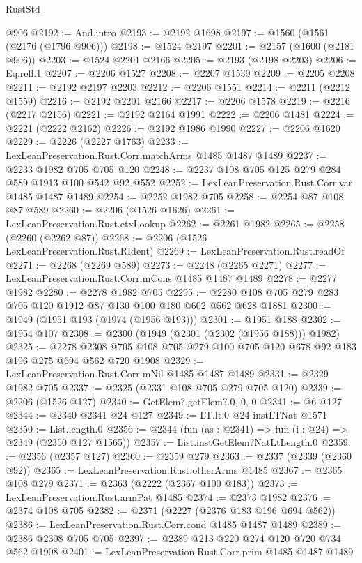 \begin{lexlean}{RustStd}
\begin{coremodule}
    @906
@2192 := And.intro
@2193 := @2192 @1698
@2197 := @1560 (@1561 (@2176 (@1796 @906)))
@2198 := @1524 @2197
@2201 := @2157 (@1600 (@2181 @906))
@2203 := @1524 @2201 @2166
@2205 := @2193 (@2198 @2203)
@2206 := Eq.refl.{1}
@2207 := @2206 @1527
@2208 := @2207 @1539
@2209 := @2205 @2208
@2211 := @2192 @2197 @2203
@2212 := @2206 @1551
@2214 := @2211 (@2212 @1559)
@2216 := @2192 @2201 @2166
@2217 := @2206 @1578
@2219 := @2216 (@2217 @2156)
@2221 := @2192 @2164 @1991
@2222 := @2206 @1481
@2224 := @2221 (@2222 @2162)
@2226 := @2192 @1986 @1990
@2227 := @2206 @1620
@2229 := @2226 (@2227 @1763)
@2233 := LexLeanPreservation.Rust.Corr.matchArms @1485 @1487 @1489
@2237 := @2233 @1982 @705 @705 @120
@2248 := @2237 @108 @705 @125 @279 @284 @589 @1913 @100 @542 @92 @552
@2252 := LexLeanPreservation.Rust.Corr.var @1485 @1487 @1489
@2254 := @2252 @1982 @705
@2258 := @2254 @87 @108 @87 @589
@2260 := @2206 (@1526 @1626)
@2261 := LexLeanPreservation.Rust.ctxLookup
@2262 := @2261 @1982
@2265 := @2258 (@2260 (@2262 @87))
@2268 := @2206 (@1526 LexLeanPreservation.Rust.RIdent)
@2269 := LexLeanPreservation.Rust.readOf
@2271 := @2268 (@2269 @589)
@2273 := @2248 (@2265 @2271)
@2277 := LexLeanPreservation.Rust.Corr.mCons @1485 @1487 @1489
@2278 := @2277 @1982
@2280 := @2278 @1982 @705
@2295 := @2280 @108 @705 @279 @283 @705 @120 @1912 @87 @130 @100 @180 @602 @562 @628 @1881
@2300 := @1949 (@1951 @193 (@1974 (@1956 @193)))
@2301 := @1951 @188
@2302 := @1954 @107
@2308 := @2300 (@1949 (@2301 (@2302 (@1956 @188))) @1982)
@2325 := @2278 @2308 @705 @108 @705 @279 @100 @705 @120 @678 @92 @183 @196 @275 @694 @562 @720 @1908
@2329 := LexLeanPreservation.Rust.Corr.mNil @1485 @1487 @1489
@2331 := @2329 @1982 @705
@2337 := @2325 (@2331 @108 @705 @279 @705 @120)
@2339 := @2206 (@1526 @127)
@2340 := GetElem?.getElem?.{0, 0, 0}
@2341 := @6 @127
@2344 := @2340 @2341 @24 @127
@2349 := LT.lt.{0} @24 instLTNat @1571
@2350 := List.length.{0}
@2356 := @2344 (fun (as : @2341) => fun (i : @24) => @2349 (@2350 @127 @1565))
@2357 := List.instGetElem?NatLtLength.{0}
@2359 := @2356 (@2357 @127)
@2360 := @2359 @279
@2363 := @2337 (@2339 (@2360 @92))
@2365 := LexLeanPreservation.Rust.otherArms @1485
@2367 := @2365 @108 @279
@2371 := @2363 (@2222 (@2367 @100 @183))
@2373 := LexLeanPreservation.Rust.armPat @1485
@2374 := @2373 @1982
@2376 := @2374 @108 @705
@2382 := @2371 (@2227 (@2376 @183 @196 @694 @562))
@2386 := LexLeanPreservation.Rust.Corr.cond @1485 @1487 @1489
@2389 := @2386 @2308 @705 @705
@2397 := @2389 @213 @220 @274 @120 @720 @734 @562 @1908
@2401 := LexLeanPreservation.Rust.Corr.prim @1485 @1487 @1489

\end{coremodule}
\end{lexlean}

